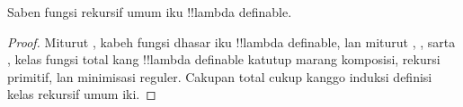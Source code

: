\documentclass[../../../include/open-logic-section]{subfiles}
\begin{document}
\begin{prop}
  Saben fungsi rekursif umum iku !!{lambda definable}.
\end{prop}

\begin{proof}
 Miturut , kabeh fungsi dhasar iku
 !!{lambda definable}, lan miturut ,
 , sarta , kelas fungsi total kang
 !!{lambda definable} katutup marang komposisi, rekursi primitif,
 lan minimisasi reguler.
Cakupan total cukup kanggo induksi definisi kelas rekursif umum iki.\end{proof}
\end{document}
